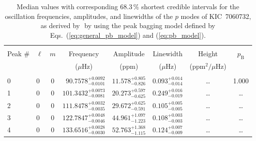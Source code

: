 \begin{table*}[!]
\begin{tabular}{llcrrlrc}
\hline
\end{tabular}
\end{table*}

\begin{table*}[!]
\caption{Median values with corresponding 68.3\,\% shortest credible intervals for the oscillation frequencies, amplitudes, and linewidths of the $p$ modes of KIC~7060732, as derived by \diamonds\,\,by using the peak bagging model defined by Eqs.~(\ref{eq:general_pb_model}) and (\ref{eq:pb_model}).}
\label{tab:7060732p}
\centering
\begin{tabular}{llcrrlrc}
\hline\hline
\\[-8pt]          
Peak \# & $\ell$ & $m$ & \multicolumn{1}{c}{Frequency} & \multicolumn{1}{c}{Amplitude} & \multicolumn{1}{c}{Linewidth} & \multicolumn{1}{c}{Height}& $p_\mathrm{B}$\\
 & & & \multicolumn{1}{c}{($\mu$Hz)} & \multicolumn{1}{c}{(ppm)} & \multicolumn{1}{c}{($\mu$Hz)} & \multicolumn{1}{c}{(ppm$^2/\mu$Hz)}\\
\hline \\[-8pt]
0 & 0 & 0 & $     90.7578_{-      0.0101}^{+      0.0092}$ & $      11.578_{-       0.826}^{+       0.805}$ & $       0.093_{-       0.014}^{+       0.014}$ & \multicolumn{1}{c}{\dots} & 1.000\\[1pt]
1 & 0 & 0 & $    101.3432_{-      0.0081}^{+      0.0073}$ & $      20.273_{-       0.625}^{+       0.597}$ & $       0.249_{-       0.019}^{+       0.016}$ & \multicolumn{1}{c}{\dots} & \dots \\[1pt]
2 & 0 & 0 & $    111.8478_{-      0.0035}^{+      0.0032}$ & $      29.672_{-       0.591}^{+       0.625}$ & $       0.105_{-       0.005}^{+       0.005}$ & \multicolumn{1}{c}{\dots} & \dots \\[1pt]
3 & 0 & 0 & $    122.7847_{-      0.0046}^{+      0.0048}$ & $      44.961_{-       1.223}^{+       1.097}$ & $       0.108_{-       0.003}^{+       0.003}$ & \multicolumn{1}{c}{\dots} & \dots \\[1pt]
4 & 0 & 0 & $    133.6516_{-      0.0030}^{+      0.0028}$ & $      52.763_{-       1.115}^{+       1.368}$ & $       0.124_{-       0.009}^{+       0.007}$ & \multicolumn{1}{c}{\dots} & \dots \\[1pt]

\end{tabular}
\end{table*}
